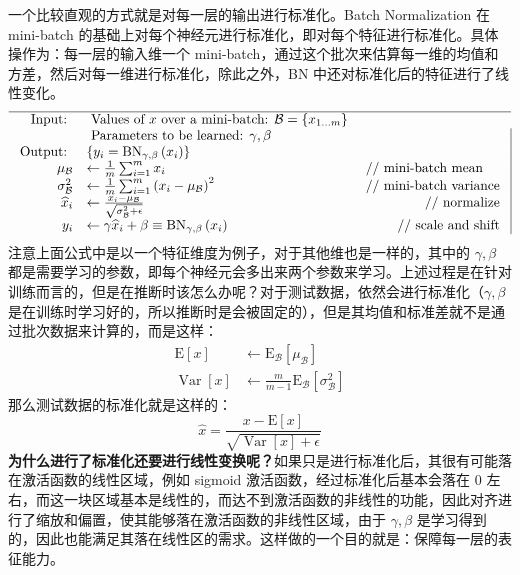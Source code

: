 一个比较直观的方式就是对每一层的输出进行标准化。Batch Normalization 在 mini-batch 的基础上对每个神经元进行标准化，即对每个特征进行标准化。具体操作为：每一层的输入维一个 mini-batch，通过这个批次来估算每一维的均值和方差，然后对每一维进行标准化，除此之外，BN 中还对标准化后的特征进行了线性变化。
$$
\begin{array}{rlr|}
	\hline \text { Input: } & \text { Values of } x \text { over a mini-batch: } \mathcal{B}=\left\{x_{1 \ldots m}\right\} \\
	& \text { Parameters to be learned: } \gamma, \beta & \\
	\text { Output: } & \left\{y_{i}=\operatorname{BN}_{\gamma, \beta}\left(x_{i}\right)\right\} & \\
	\mu_{\mathcal{B}} & \leftarrow \frac{1}{m} \sum_{i=1}^{m} x_{i} & \multicolumn{1}{l|}{\text { // mini-batch mean }} \\
	\sigma_{\mathcal{B}}^{2} & \leftarrow \frac{1}{m} \sum_{i=1}^{m}\left(x_{i}-\mu_{\mathcal{B}}\right)^{2} & \text { // mini-batch variance } \\
	\widehat{x}_{i} & \leftarrow \frac{x_{i}-\mu_{\mathcal{B}}}{\sqrt{\sigma_{\mathcal{B}}^{2}+\epsilon}} & \text { // normalize } \\
	y_{i} & \leftarrow \gamma \widehat{x}_{i}+\beta \equiv \mathrm{BN}_{\gamma, \beta}\left(x_{i}\right) & \text { // scale and shift }
\end{array}
$$
注意上面公式中是以一个特征维度为例子，对于其他维也是一样的，其中的 $\gamma, \beta$ 都是需要学习的参数，即每个神经元会多出来两个参数来学习。上述过程是在针对训练而言的，但是在推断时该怎么办呢？对于测试数据，依然会进行标准化（$\gamma, \beta$ 是在训练时学习好的，所以推断时是会被固定的），但是其均值和标准差就不是通过批次数据来计算的，而是这样：
$$
\begin{aligned}
	\mathrm{E}[x] & \leftarrow \mathrm{E}_{\mathcal{B}}\left[\mu_{\mathcal{B}}\right] \\
	\operatorname{Var}[x] & \leftarrow \frac{m}{m-1} \mathrm{E}_{\mathcal{B}}\left[\sigma_{\mathcal{B}}^{2}\right]
\end{aligned}
$$
那么测试数据的标准化就是这样的：
$$
\widehat{x}=\frac{x-\mathrm{E}[x]}{\sqrt{\operatorname{Var}[x]+\epsilon}}
$$
\textbf{为什么进行了标准化还要进行线性变换呢？}如果只是进行标准化后，其很有可能落在激活函数的线性区域，例如 sigmoid 激活函数，经过标准化后基本会落在 0 左右，而这一块区域基本是线性的，而达不到激活函数的非线性的功能，因此对齐进行了缩放和偏置，使其能够落在激活函数的非线性区域，由于 $\gamma, \beta$ 是学习得到的，因此也能满足其落在线性区的需求。这样做的一个目的就是：保障每一层的表征能力。


